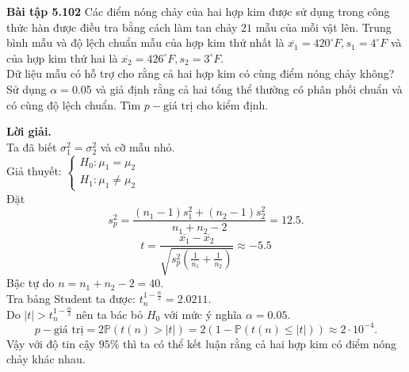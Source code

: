 \begin{mybox}
\textbf{Bài tập 5.102} Các điểm nóng chảy của hai hợp kim được sử dụng trong công thức hàn được điều tra bằng cách làm tan chảy $21$ mẫu của mỗi vật lên. Trung bình mẫu và độ lệch chuẩn mẫu của hợp kim thứ nhất là $\overline{x_1} = 420^\circ F, s_1 = 4^\circ F$ và của hợp kim thứ hai là $\overline{x_2} = 426^\circ F, s_2 = 3^\circ F.$\\
Dữ liệu mẫu có hỗ trợ cho rằng cả hai hợp kim có cùng điểm nóng chảy không? Sử dụng $\alpha = 0.05$ và giả định rằng cả hai tổng thể thường có phân phối chuẩn và có cùng độ lệch chuẩn. Tìm $p-\text{giá trị}$ cho kiểm định.
\end{mybox}
\textbf{Lời giải.}\\
Ta đã biết $\sigma_1^2 = \sigma_2^2 $ và cỡ mẫu nhỏ.\\
Giả thuyết: $\begin{cases}
H_0: \mu_1 = \mu_2\\
H_1: \mu_1 \ne \mu_2
\end{cases}$\\
Đặt $$s_p^2 = \frac{{\left( {{n_1} - 1} \right)s_1^2 + \left( {{n_2} - 1} \right)s_2^2}}{{{n_1} + {n_2} - 2}} = 12.5.$$
$$t = \frac{{\overline {{x_1}}  - \overline {{x_2}} }}{{\sqrt {s_p^2\left( {\frac{1}{{{n_1}}} + \frac{1}{{{n_2}}}} \right)} }} \approx -5.5$$
Bậc tự do $n = n_1 + n_2 - 2 = 40.$\\
Tra bảng Student ta được: $t_{n}^{1 - \frac{\alpha}{2}} = 2.0211.$\\
Do $\left| t \right| > t_{n}^{1 - \frac{\alpha}{2}}$ nên ta bác bỏ $H_0$ với mức ý nghĩa $\alpha = 0.05.$\\
$$p-\text{giá trị} = 2\mathbb{P}\left( {t\left( n \right) > \left| t \right|} \right) = 2\left( {1 - \mathbb{P}\left( {t\left( n \right) \leqslant \left| t \right|} \right)} \right) \approx 2 \cdot 10^{-4}.$$
Vậy với độ tin cậy $95\%$ thì ta có thể kết luận rằng cả hai hợp kim có điểm nóng chảy khác nhau.

